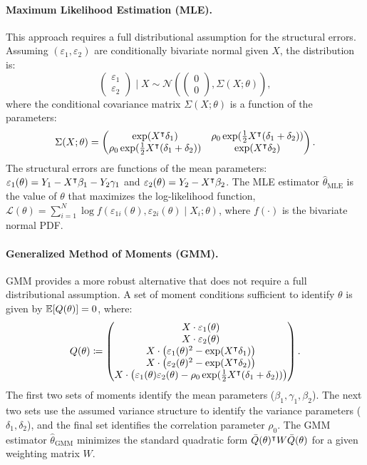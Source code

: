 \paragraph{Maximum Likelihood Estimation (MLE).}
This approach requires a full distributional assumption for the structural errors. Assuming $(\varepsilon_1, \varepsilon_2)$ are conditionally bivariate normal given $X$, the distribution is:
\[
\begin{pmatrix} \varepsilon_1 \\ \varepsilon_2 \end{pmatrix} \mid X \sim \mathcal{N} \left( \begin{pmatrix} 0 \\ 0 \end{pmatrix}, \Sigma(X; \theta) \right),
\]
where the conditional covariance matrix $\Sigma(X; \theta)$ is a function of the parameters:
\[
\Sigma(X; \theta) = \begin{pmatrix}
\exp(X^{\intercal}\delta_1) & \rho_0 \exp(\frac{1}{2}X^{\intercal}(\delta_1+\delta_2)) \\
\rho_0 \exp(\frac{1}{2}X^{\intercal}(\delta_1+\delta_2)) & \exp(X^{\intercal}\delta_2)
\end{pmatrix}.
\]
The structural errors are functions of the mean parameters: $\varepsilon_1(\theta) = Y_1 - X^{\intercal}\beta_1 - Y_2\gamma_1$ and $\varepsilon_2(\theta) = Y_2 - X^{\intercal}\beta_2$. The MLE estimator $\hat{\theta}_{\text{MLE}}$ is the value of $\theta$ that maximizes the log-likelihood function, $\mathcal{L}(\theta) = \sum_{i=1}^N \log f(\varepsilon_{1i}(\theta), \varepsilon_{2i}(\theta) \mid X_i; \theta)$, where $f(\cdot)$ is the bivariate normal PDF.

\paragraph{Generalized Method of Moments (GMM).}
GMM provides a more robust alternative that does not require a full distributional assumption. A set of moment conditions sufficient to identify $\theta$ is given by $\mathbb{E}[Q(\theta)]=0$, where:
\[
Q(\theta) \coloneqq \begin{pmatrix}
X \cdot \varepsilon_1(\theta) \\
X \cdot \varepsilon_2(\theta) \\
X \cdot \left(\varepsilon_1(\theta)^2 - \exp(X^{\intercal}\delta_1)\right) \\
X \cdot \left(\varepsilon_2(\theta)^2 - \exp(X^{\intercal}\delta_2)\right) \\
X \cdot \left(\varepsilon_1(\theta)\varepsilon_2(\theta) - \rho_0 \exp(\frac{1}{2}X^{\intercal}(\delta_1+\delta_2))\right)
\end{pmatrix}.
\]
The first two sets of moments identify the mean parameters ($\beta_1, \gamma_1, \beta_2$). The next two sets use the assumed variance structure to identify the variance parameters ($\delta_1, \delta_2$), and the final set identifies the correlation parameter $\rho_0$. The GMM estimator $\hat{\theta}_{\text{GMM}}$ minimizes the standard quadratic form $\bar{Q}(\theta)^{\intercal} W \bar{Q}(\theta)$ for a given weighting matrix $W$.

